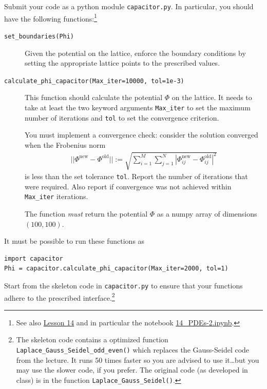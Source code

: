 \documentclass[letterpaper]{scrartcl}
\begin{document}
Submit your code as a python module \texttt{capacitor.py}. In
particular, you should have the following functions:\footnote{See also
  \href{http://asu-compmethodsphysics-phy494.github.io/ASU-PHY494//2018/04/05/14_PDEs/}{Lesson
    14} and in particular the notebook
  \href{http://nbviewer.jupyter.org/github/ASU-CompMethodsPhysics-PHY494/PHY494-resources/blob/master/14_PDEs/14_PDEs-2.ipynb}{14\_PDEs-2.ipynb}.}
\begin{description}
\item[\texttt{set\_boundaries(Phi)}] Given the potential on the
  lattice, enforce the boundary conditions by setting the appropriate
  lattice points to the prescribed values.
\item[\texttt{calculate\_phi\_capacitor(Max\_iter=10000, tol=1e-3)}] This
  function should calculate the potential $\Phi$ on the lattice. It
  needs to take at least the two keyword arguments \texttt{Max\_iter}
  to set the maximum number of iterations and \texttt{tol} to set the
  convergence criterion.

  You must implement a convergence check: consider the solution
  converged when the Frobenius norm
  \begin{gather}
    ||\Phi^{\text{new}} - \Phi^{\text{old}}|| :=
    \sqrt{\sum_{i=1}^{M}\sum_{j=1}^{N} \left|\Phi^{\text{new}}_{ij} -
        \Phi^{\text{old}}_{ij}\right|^{2}}
    \label{eq:Frobeniusnorm}    
  \end{gather}
  is less than the set tolerance \texttt{tol}. Report the
  number of iterations that were required. Also report if convergence
  was not achieved within \texttt{Max\_iter} iterations.

  The function \emph{must} return the potential $\Phi$ as a numpy
  array of dimensions $(100, 100)$.
\end{description}
It must be possible to run these functions as
\begin{verbatim}
import capacitor
Phi = capacitor.calculate_phi_capacitor(Max_iter=2000, tol=1)
\end{verbatim}

Start from the skeleton code in \texttt{capacitor.py} to ensure that
your functions adhere to the prescribed interface.\footnote{The
  skeleton code contains a optimized function
  \texttt{Laplace\_Gauss\_Seidel\_odd\_even()} which replaces the
  Gauss-Seidel code from the lecture. It runs 50 times faster so you
  are advised to use it\dots but you may use the slower code, if you
  prefer. The original code (as developed in class) is in the function
  \texttt{Laplace\_Gauss\_Seidel()}.}
\end{document}
